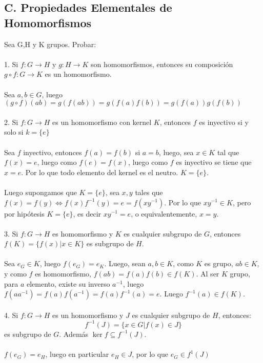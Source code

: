 \documentclass{article}
\begin{document}
\subsection*{C. Propiedades Elementales de Homomorfismos}
Sea G,H y K grupos. Probar:
\\
\\
1. Si $f: G \to H$ y $g: H \to K$ son homomorfismos, entonces su composición $g \circ f: G \to K$ es un homomorfismo.
\\
\\
Sea $a,b \in G$, luego $(g \circ f)(ab)=g(f(ab))=g(f(a)f(b))=g(f(a))g(f(b))$
\\
\\
2. Si $f: G \to H$ es un homomorfismo con kernel $K$, entonces $f$ es inyectivo si y solo si $k=\{ e\}$
\\
\\
Sea $f$ inyectivo, entonces $f(a)=f(b)$ si $a=b$, luego, sea $x \in K$ tal que $f(x)=e$, luego como $f(e)=f(x)$, luego como $f$ es inyectivo se tiene que $x=e$. Por lo que todo elemento del kernel es el neutro. $K=\{e\}$.
\\
\\
Luego supongamos que $K=\{e\}$, sea $x,y$ tales que $f(x)=f(y) \Longleftrightarrow f(x)f^{-1}(y)=e=f(xy^{-1})$. Por lo que $xy^{-1} \in K$, pero por hipótesis $K=\{e\}$, es decir $xy^{-1}=e$, o equivalentemente, $x=y$.
\\
\\
3. Si $f:G \to H$ es homomorfismo y $K$ es cualquier subgrupo de $G$, entonces $f(K)=\{f(x)| x \in K\}$ es subgrupo de $H$.
\\
\\
Sea $e_{G} \in K$, luego $f(e_{G})=e_{K}$. Luego, sean $a,b \in K$, como $K$ es grupo, $ab \in K$, y como $f$ es homomorfismo, $f(ab)=f(a)f(b) \in f(K)$. Al ser $K$ grupo, para $a$ elemento, existe su inverso $a^{-1}$, luego $f(aa^{-1})=f(a)f(a^{-1})=f(a)f^{-1}(a) = e$. Luego $f^{-1}(a) \in f(K)$.
\\
\\
4. Si $f: G \to H$ es un homomorfismo y $J$ es cualquier subgrupo de $H$, entonces:
\begin{equation*}
    f^{-1}(J)=\{x \in G | f(x) \in J \}
\end{equation*}
es subgrupo de $G$. Además $\ker{f} \subseteq f^{-1}(J)$.
\\
\\
$f(e_G)=e_{H}$, luego en particular $e_{H} \in J$, por lo que $e_{G} \in f^{1}(J)$
\\
\end{document}
